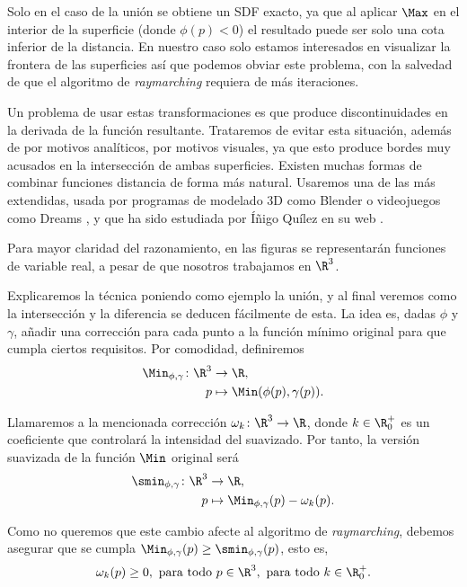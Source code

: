 Solo en el caso de la unión se obtiene un SDF exacto, ya que al aplicar $\Max$ en el interior de la superficie (donde $\phi(p) < 0$) el resultado puede ser solo una cota inferior de la distancia. En nuestro caso solo estamos interesados en visualizar la frontera de las superficies así que podemos obviar este problema, con la salvedad de que el algoritmo de \textit{raymarching} requiera de más iteraciones.

Un problema de usar estas transformaciones es que produce discontinuidades en la derivada de la función resultante. Trataremos de evitar esta situación, además de por motivos analíticos, por motivos visuales, ya que esto produce bordes muy acusados en la intersección de ambas superficies. Existen muchas formas de combinar funciones distancia de forma más natural. Usaremos una de las más extendidas, usada por programas de modelado 3D como Blender \cite{repo:blender} o videojuegos como Dreams \cite{game:dreams}, y que ha sido estudiada por Íñigo Quílez en su web \cite{article:smooth}.

\begin{observacion}
    Para mayor claridad del razonamiento, en las figuras se representarán funciones de variable real, a pesar de que nosotros trabajamos en $\R^3$.
\end{observacion}

Explicaremos la técnica poniendo como ejemplo la unión, y al final veremos como la intersección y la diferencia se deducen fácilmente de esta. La idea es, dadas $\phi$ y $\gamma$, añadir una corrección para cada punto a la función mínimo original para que cumpla ciertos requisitos. Por comodidad, definiremos 
\begin{align*}
      \Min_{\phi,\gamma}\colon \R^3 &\to \R,\\
      p &\mapsto \Min(\phi(p),\gamma(p)).
\end{align*}

Llamaremos a la mencionada corrección $\omega_k\colon \R^3\to\R$, donde $k\in \R_0^+$ es un coeficiente que controlará la intensidad del suavizado. Por tanto, la versión suavizada de la función $\Min$ original será
\begin{align*}
      \smin_{\phi,\gamma}\colon \R^3 &\to \R,\\
      p &\mapsto \Min_{\phi,\gamma}(p) - \omega_k(p).
\end{align*}

Como no queremos que este cambio afecte al algoritmo de \textit{raymarching}, debemos asegurar que se cumpla $\Min_{\phi,\gamma}(p)\ge \smin_{\phi,\gamma}(p)$, esto es,
\begin{equation*}
\omega_k(p)\ge 0,\ \text{para todo } p\in \R^3,\ \text{para todo } k\in \R^+_0.
\end{equation*}

